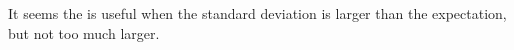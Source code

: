 \bigskip

It seems the  is
useful when the standard deviation is larger than the expectation, but
not too much larger.


{}


\nocite{mr-ra-95}

\ChapterEnd{}



